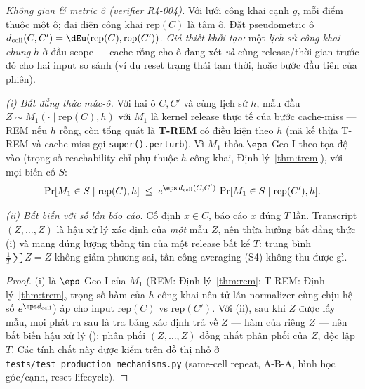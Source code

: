 \begin{dinhly}
\label{thm:smrem}
\emph{Không gian \& metric ô (verifier R4-004).} Với lưới công khai cạnh $g$, mỗi
điểm thuộc một ô; đại diện công khai $\mathrm{rep}(C)$ là tâm ô. Đặt pseudometric
ô $d_{\mathrm{cell}}(C,C')=\dEu(\mathrm{rep}(C),\mathrm{rep}(C'))$.
\emph{Giả thiết khởi tạo:} một \emph{lịch sử công khai chung} $h$ ở đầu scope ---
cache rỗng cho ô đang xét \emph{và} cùng release/thời gian trước đó cho hai input
so sánh (ví dụ reset trạng thái tạm thời, hoặc bước đầu tiên của phiên).

\emph{(i) Bất đẳng thức mức-ô.} Với hai ô $C,C'$ và cùng lịch sử $h$, mẫu đầu
$Z\sim M_1(\cdot\mid \mathrm{rep}(C),h)$ với $M_1$ là kernel release thực tế của
bước cache-miss --- REM nếu $h$ rỗng, còn tổng quát là \textbf{T-REM} có điều kiện
theo $h$ (mã kế thừa T-REM và cache-miss gọi \texttt{super().perturb}). Vì $M_1$
thỏa $\eps$-Geo-I theo tọa độ vào (trọng số reachability chỉ phụ thuộc $h$ công
khai, Định lý~\ref{thm:trem}), với mọi biến cố $S$:
\[
\Pr[M_1\in S\mid \mathrm{rep}(C),h]\;\le\;e^{\eps\,d_{\mathrm{cell}}(C,C')}\,
\Pr[M_1\in S\mid \mathrm{rep}(C'),h].
\]

\emph{(ii) Bất biến với số lần báo cáo.} Cố định $x\in C$, báo cáo $x$ đúng $T$
lần. Transcript $(Z,\dots,Z)$ là hậu xử lý xác định của \emph{một} mẫu $Z$, nên
thừa hưởng bất đẳng thức (i) và mang đúng lượng thông tin của một release bất kể
$T$: trung bình $\frac1T\sum Z=Z$ không giảm phương sai, tấn công averaging (S4)
không thu được gì.
\end{dinhly}

\begin{proof}
(i) là $\eps$-Geo-I của $M_1$ (REM: Định lý~\ref{thm:rem}; T-REM: Định
lý~\ref{thm:trem}, trọng số hàm của $h$ công khai nên tử lẫn normalizer cùng chịu
hệ số $e^{\eps d_{\mathrm{cell}}}$) áp cho input $\mathrm{rep}(C)$ vs $\mathrm{rep}(C')$. Với
(ii), sau khi $Z$ được lấy mẫu, mọi phát ra sau là tra bảng xác định trả về $Z$
--- hàm của riêng $Z$ --- nên bất biến hậu xử lý (\cite{takagi2019geo}); phân phối
$(Z,\dots,Z)$ đồng nhất phân phối của $Z$, độc lập $T$. Các tính chất này được kiểm
trên đồ thị nhỏ ở \texttt{tests/test\_production\_mechanisms.py}
(same-cell repeat, A-B-A, hình học góc/cạnh, reset lifecycle).
\end{proof}

